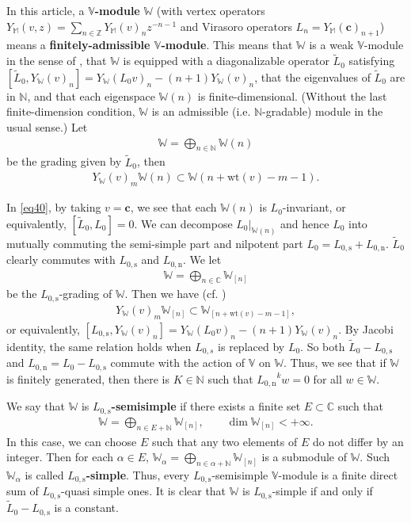 \documentclass[12pt,a4paper,notitlepage]{article}
\theoremstyle{definition}
\theoremstyle{plain}
\newcommand{\wtd}{\widetilde}
\newcommand{\Vbb}{\mathbb V}
\newcommand{\Wbb}{\mathbb W}
\newcommand{\Mbb}{\mathbb M}
\newcommand{\Cbb}{\mathbb C}
\newcommand{\Nbb}{\mathbb N}
\newcommand{\Zbb}{\mathbb Z}
\newcommand{\cbf}{\mathbf c}
\newcommand{\wt}{\mathrm{wt}}
\newcommand{\Lss}{{L_{0,\mathrm{s}}}}
\newcommand{\Lni}{{L_{0,\mathrm{n}}}}
\numberwithin{equation}{section}
\begin{document}
In this article,  a \textbf{$\Vbb$-module} $\Wbb$ (with vertex operators $Y_\Mbb(v,z)=\sum_{n\in\Zbb}Y_\Mbb(v)_nz^{-n-1}$ and Virasoro operators $L_n=Y_\Mbb(\cbf)_{n+1}$) means a \textbf{finitely-admissible $\Vbb$-module}. This means that $\Wbb$ is a weak $\Vbb$-module in the sense of \cite{DLM97}, that $\Wbb$ is equipped with a diagonalizable operator $\wtd L_0$ satisfying $[\wtd L_0,Y_\Wbb(v)_n]=Y_\Wbb(L_0 v)_n-(n+1)Y_\Wbb(v)_n$, \index{L0@$\wtd L_0$}  that the eigenvalues of $\wtd L_0$ are in $\Nbb$, and that each eigenspace $\Wbb(n)$ is finite-dimensional. (Without the last finite-dimension condition, $\Wbb$ is an admissible (i.e. $\Nbb$-gradable) module in the usual sense.) Let \index{W@$\Wbb(n),\Wbb_{(n)}$}
\begin{align*}
\Wbb=\bigoplus_{n\in\Nbb}\Wbb(n)	
\end{align*}
be the grading given by $\wtd L_0$, then \begin{align}
Y_\Wbb(v)_m\Wbb(n)\subset \Wbb(n+\wt(v)-m-1).\label{eq40}
\end{align}

In \eqref{eq40}, by taking $v=\cbf$, we see that  each $\Wbb(n)$ is $L_0$-invariant, or equivalently, $[\wtd L_0,L_0]=0$. We can decompose $L_0|_{\Wbb(n)}$ and hence $L_0$ into mutually commuting the semi-simple part and nilpotent part $L_0=\Lss+\Lni$.  \index{L0@$\Lss,\Lni$}  $\wtd L_0$ clearly commutes with $\Lss$ and $\Lni$. We let
\begin{align*}
\Wbb=\bigoplus_{n\in\Cbb}\Wbb_{[n]}	
\end{align*}
be the $\Lss$-grading of $\Wbb$. Then we have (cf. \cite[Prop. 2.19]{HLZ14})
\begin{align}
	Y_\Wbb(v)_m\Wbb_{[n]}\subset \Wbb_{[n+\wt(v)-m-1]},
\end{align}
or equivalently, $[\Lss,Y_\Wbb(v)_n]=Y_\Wbb(L_0 v)_n-(n+1)Y_\Wbb(v)_n$. By Jacobi identity, the same relation holds when $L_{0,s}$ is replaced by $L_0$. So both $\wtd L_0-\Lss$ and $\Lni=L_0-\Lss$ commute with the action of $\Vbb$ on $\Wbb$. Thus, we see that if $\Wbb$ is finitely generated, then there is $K\in\Nbb$ such that $\Lni^kw=0$ for all $w\in\Wbb$.

We say that $\Wbb$ is \textbf{$\Lss$-semisimple} if there exists a finite set $E\subset\Cbb$ such that 
\begin{align*}
\Wbb=\bigoplus_{n\in E+\Nbb}\Wbb_{[n]},\qquad \dim\Wbb_{[n]}<+\infty.
\end{align*}
In this case, we can choose $E$ such that any two elements of $E$ do not differ by an integer. Then for each $\alpha\in E$, $\Wbb_\alpha=\bigoplus_{n\in\alpha+\Nbb}\Wbb_{[n]}$ is a submodule of $\Wbb$. Such $\Wbb_\alpha$ is called \textbf{$\Lss$-simple}. Thus, every $\Lss$-semisimple $\Vbb$-module is a finite direct sum of $\Lss$-quasi simple ones. It is clear that $\Wbb$ is $\Lss$-simple if and only if  $\wtd L_0-\Lss$ is a constant.
\end{document}
